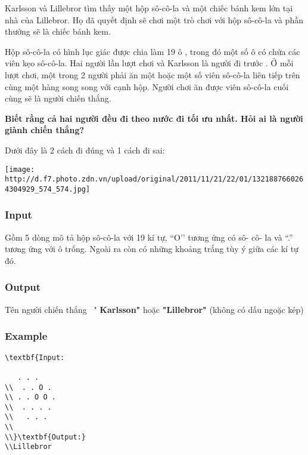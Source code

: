 



   Karlsson và Lillebror tìm thấy một hộp sô-cô-la và một chiếc bánh kem lớn tại nhà của Lillebror. Họ đã quyết định sẽ chơi một trò chơi với hộp sô-cô-la và phần thưởng sẽ là chiếc bánh kem.  

   Hộp sô-cô-la có hình lục giác được chia làm       19 ô      , trong đó một số ô có chứa các viên kẹo sô-cô-la. Hai người lần lượt chơi và       Karlsson là người đi trước      . Ở mỗi lượt chơi, một trong 2 người phải ăn một hoặc một số viên sô-cô-la liên tiếp trên cùng một hàng song song với cạnh hộp. Người chơi ăn được viên sô-cô-la cuối cùng sẽ là người chiến thắng.  

\textbf{    Biết rằng cả hai người đều đi theo nước đi tối ưu nhất. Hỏi ai là người giành chiến thắng?   }

   Dưới đây là 2 cách đi đúng và 1 cách đi sai:  


\texttt{[image: http://d.f7.photo.zdn.vn/upload/original/2011/11/21/22/01/1321887660264304929\_574\_574.jpg]}

\subsubsection{   Input  }

   Gồm 5 dòng mô tả hộp sô-cô-la với 19 kí tự, “O’’ tương ứng có sô- cô- la và “.” tương ứng với ô trống. Ngoài ra còn có những khoảng trắng tùy ý giữa các kí tự đó.  

\subsubsection{   Output  }

   Tên người chiến thắng  "   \textbf{    Karlsson"   }   hoặc   \textbf{    "Lillebror"   }   (không có dấu ngoặc kép)  

\subsubsection{   Example  }
\begin{verbatim}
\textbf{Input:

   . . .
\\  . . O .
\\ . . O O .
\\  . . . .
\\   . . .
\\
\\}\textbf{Output:}
\\Lillebror\end{verbatim}